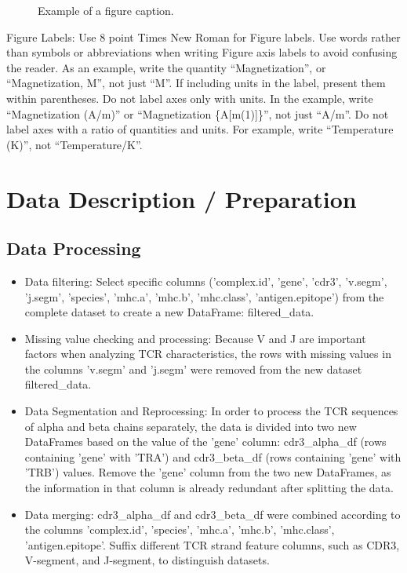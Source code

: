 \documentclass[conference]{IEEEtran}
\begin{document}
	\begin{figure}[htbp]
		\caption{Example of a figure caption.}
		\label{fig}
	\end{figure}
	
	Figure Labels: Use 8 point Times New Roman for Figure labels. Use words 
	rather than symbols or abbreviations when writing Figure axis labels to 
	avoid confusing the reader. As an example, write the quantity 
	``Magnetization'', or ``Magnetization, M'', not just ``M''. If including 
	units in the label, present them within parentheses. Do not label axes only 
	with units. In the example, write ``Magnetization (A/m)'' or ``Magnetization 
	\{A[m(1)]\}'', not just ``A/m''. Do not label axes with a ratio of 
	quantities and units. For example, write ``Temperature (K)'', not 
	``Temperature/K''.
	
	
	\section{Data Description / Preparation}
	
	\subsection{Data Processing}
	\begin{itemize}
		\item Data filtering: Select specific columns ('complex.id', 'gene', 'cdr3', 'v.segm', 'j.segm', 'species', 'mhc.a', 'mhc.b', 'mhc.class', 'antigen.epitope') from the complete dataset to create a new DataFrame: filtered\_data.
		\item Missing value checking and processing: Because V and J are important factors when analyzing TCR characteristics, the rows with missing values in the columns 'v.segm' and 'j.segm' were removed from the new dataset filtered\_data.
		\item Data Segmentation and Reprocessing: In order to process the TCR sequences of alpha and beta chains separately, the data is divided into two new DataFrames based on the value of the 'gene' column: cdr3\_alpha\_df (rows containing 'gene' with 'TRA') and cdr3\_beta\_df (rows containing 'gene' with 'TRB') values. Remove the 'gene' column from the two new DataFrames, as the information in that column is already redundant after splitting the data.
		\item Data merging: cdr3\_alpha\_df and cdr3\_beta\_df were combined according to the columns 'complex.id', 'species', 'mhc.a', 'mhc.b', 'mhc.class', 'antigen.epitope'. Suffix different TCR strand feature columns, such as CDR3, V-segment, and J-segment, to distinguish datasets.
		
	\end{itemize}
	
\end{document}
